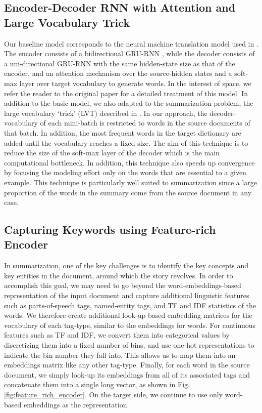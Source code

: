 \documentclass[11pt]{article}
\begin{document}
\subsection{Encoder-Decoder RNN with Attention and Large Vocabulary Trick}\label{sec:enc_dec}
Our baseline model corresponds to the neural machine translation model used in . The encoder consists of a bidirectional GRU-RNN \cite{gru_rnn}, while the decoder consists of a uni-directional GRU-RNN with the same hidden-state size as that of the encoder, and an attention mechanism over the source-hidden states and a soft-max layer over target vocabulary to generate words. In the interest of space, we refer the reader to the original paper for a detailed treatment of this model.
In addition to the basic model, we also adapted to the summarization problem, the large vocabulary `trick' (LVT) described in . In our approach, the decoder-vocabulary of each mini-batch is restricted to words in the source documents of that batch. In addition, the most frequent words in the target dictionary are added until the vocabulary reaches a fixed size. The aim of this technique is to reduce the size of the soft-max layer of the decoder which is the main computational bottleneck. In addition, this technique also speeds up convergence by focusing the modeling effort only on the words that are essential to a given example. This technique is particularly well suited to summarization since a large proportion of the words in the summary come from the source document in any case.



\subsection{Capturing Keywords using Feature-rich Encoder}\label{sec:feats}
In summarization, one of the key challenges is to identify the key concepts and key entities in the document, around which the story revolves. In order to accomplish this goal, we may need to go beyond the word-embeddings-based representation of the input document and capture additional linguistic features such as parts-of-speech tags, named-entity tags, and TF and IDF statistics of the words. We therefore create additional look-up based embedding matrices for the vocabulary of each tag-type, similar to the embeddings for words. For continuous features such as TF and IDF, we convert them into categorical values by discretizing them into a fixed number of bins, and use one-hot representations to indicate the bin number they fall into. This allows us to map them into an embeddings matrix like any other tag-type. Finally, for each word in the source document, we simply look-up its embeddings from all of its associated tags and concatenate them into a single long vector, as shown in Fig. \ref{fig:feature_rich_encoder}.  On the target side, we continue to use only word-based embeddings as the representation.
\end{document}
